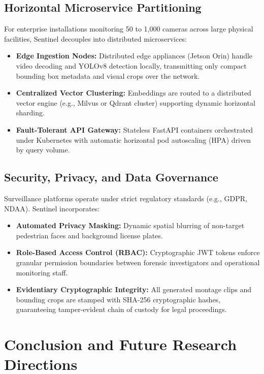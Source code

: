 \documentclass[12pt,a4paper]{article}
\begin{document}
\subsection{Horizontal Microservice Partitioning}
For enterprise installations monitoring 50 to 1,000 cameras across large physical facilities, Sentinel decouples into distributed microservices:
\begin{itemize}
    \item \textbf{Edge Ingestion Nodes:} Distributed edge appliances (Jetson Orin) handle video decoding and YOLOv8 detection locally, transmitting only compact bounding box metadata and visual crops over the network.
    \item \textbf{Centralized Vector Clustering:} Embeddings are routed to a distributed vector engine (e.g., Milvus or Qdrant cluster) supporting dynamic horizontal sharding.
    \item \textbf{Fault-Tolerant API Gateway:} Stateless FastAPI containers orchestrated under Kubernetes with automatic horizontal pod autoscaling (HPA) driven by query volume.
\end{itemize}

\subsection{Security, Privacy, and Data Governance}
Surveillance platforms operate under strict regulatory standards (e.g., GDPR, NDAA). Sentinel incorporates:
\begin{itemize}
    \item \textbf{Automated Privacy Masking:} Dynamic spatial blurring of non-target pedestrian faces and background license plates.
    \item \textbf{Role-Based Access Control (RBAC):} Cryptographic JWT tokens enforce granular permission boundaries between forensic investigators and operational monitoring staff.
    \item \textbf{Evidentiary Cryptographic Integrity:} All generated montage clips and bounding crops are stamped with SHA-256 cryptographic hashes, guaranteeing tamper-evident chain of custody for legal proceedings.
\end{itemize}

\section{Conclusion and Future Research Directions}
\end{document}
